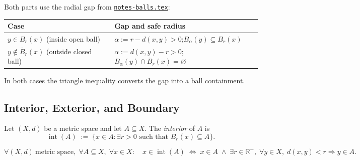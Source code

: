 \begin{remark*}[Intuition]
Both parts use the radial gap from
\hyperref[rem:interior-ball-identity]{\texttt{notes-balls.tex}}:

\smallskip
\begin{center}
\begin{tabular}{l l}
\toprule
\textbf{Case} & \textbf{Gap and safe radius} \\
\midrule
$y \in B_r(x)$ (inside open ball)
  & $\alpha := r - d(x,y) > 0$;\quad $B_\alpha(y) \subseteq B_r(x)$ \\[4pt]
$y \notin \overline{B}_r(x)$ (outside closed ball)
  & $\alpha := d(x,y) - r > 0$;\quad $B_\alpha(y) \cap \overline{B}_r(x) = \varnothing$ \\
\bottomrule
\end{tabular}
\end{center}

\smallskip\noindent
In both cases the triangle inequality converts the gap into a ball
containment.
\end{remark*}



\subsection{Interior, Exterior, and Boundary}
\label{sec:interior-exterior-boundary}

\begin{tcolorbox}[colback=propbox, colframe=propborder, arc=2pt,
  left=6pt, right=6pt, top=4pt, bottom=4pt,
  title={\small\textbf{Definition (Interior)}},
  fonttitle=\small\bfseries]
\begin{definition}[Interior]
\label{def:interior}
Let $(X,d)$ be a metric space and let $A \subseteq X$.
The \emph{interior} of $A$ is
\[
  \operatorname{int}(A)
  \;:=\;
  \bigl\{x \in A : \exists r > 0 \text{ such that } B_r(x) \subseteq A\bigr\}.
\]
\end{definition}
\end{tcolorbox}

\begin{remark*}
\[
\forall (X,d)\ \text{metric space},\;
\forall A \subseteq X,\;
\forall x \in X:\quad
x \in \operatorname{int}(A)
\;\iff\;
x \in A
\;\land\;
\exists r \in \mathbb{R}^{+},\;
\forall y \in X,\;
d(x,y) < r \Rightarrow y \in A.
\]
\end{remark*}

